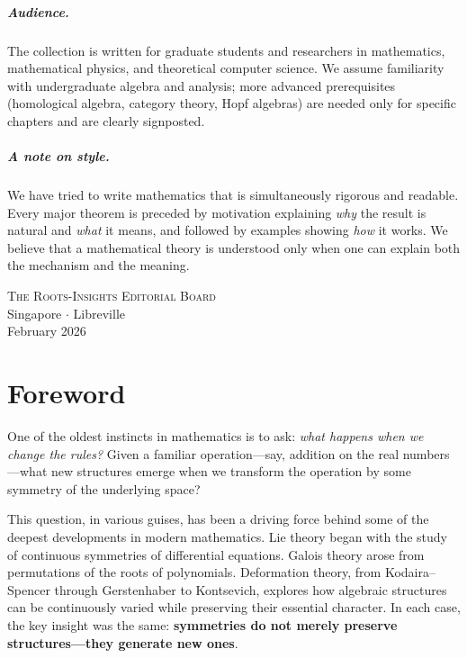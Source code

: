 \documentclass[11pt,a4paper,openany]{book}
\theoremstyle{plain}
\theoremstyle{definition}
\begin{document}
\paragraph{Audience.}
The collection is written for graduate students and researchers in mathematics, mathematical physics, and theoretical computer science. We assume familiarity with undergraduate algebra and analysis; more advanced prerequisites (homological algebra, category theory, Hopf algebras) are needed only for specific chapters and are clearly signposted.

\paragraph{A note on style.}
We have tried to write mathematics that is simultaneously rigorous and readable. Every major theorem is preceded by motivation explaining \emph{why} the result is natural and \emph{what} it means, and followed by examples showing \emph{how} it works. We believe that a mathematical theory is understood only when one can explain both the mechanism and the meaning.

\bigskip

\begin{flushright}
\textsc{The Roots-Insights Editorial Board}\\
Singapore $\cdot$ Libreville\\
February 2026
\end{flushright}

\cleardoublepage

\chapter*{Foreword}

One of the oldest instincts in mathematics is to ask: \emph{what happens when we change the rules?} Given a familiar operation---say, addition on the real numbers---what new structures emerge when we transform the operation by some symmetry of the underlying space?

This question, in various guises, has been a driving force behind some of the deepest developments in modern mathematics. Lie theory began with the study of continuous symmetries of differential equations. Galois theory arose from permutations of the roots of polynomials. Deformation theory, from Kodaira--Spencer through Gerstenhaber to Kontsevich, explores how algebraic structures can be continuously varied while preserving their essential character. In each case, the key insight was the same: \textbf{symmetries do not merely preserve structures---they generate new ones}.
\end{document}
